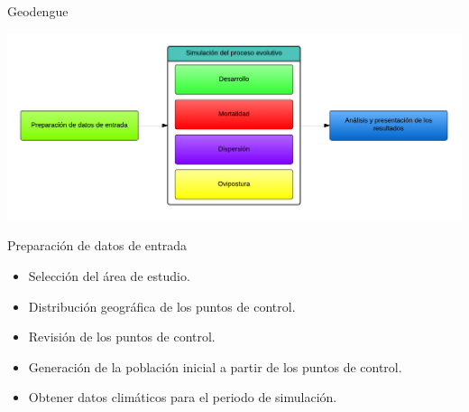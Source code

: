 
\begin{frame}[c]{Geodengue}
\begin{center}
    \includegraphics[width=\textwidth]{./graphics/propuesta.png}
\end{center}
\end{frame}


\begin{frame}[c]{Preparación de datos de entrada}
  \begin{center}
    \begin{itemize}
      \item Selección del área de estudio.
      \item Distribución geográfica de los puntos de control.
      \item Revisión de los puntos de control.
      \item Generación de la población inicial a partir de los puntos de control.
      \item Obtener datos climáticos para el periodo de simulación.
    \end{itemize}
  \end{center}
\end{frame}

